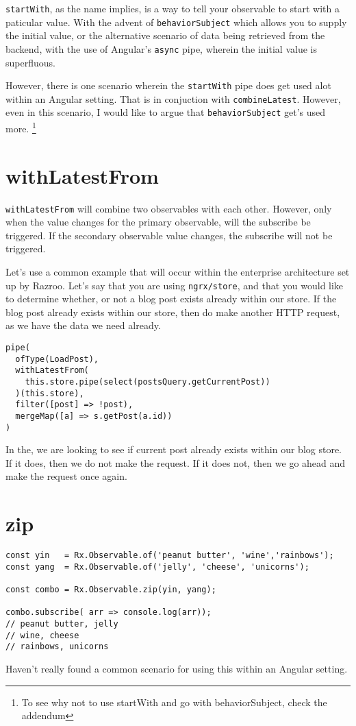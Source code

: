 \lstinline{startWith}, as the name implies, is a way to tell your observable 
to start with a paticular value. With the advent of \lstinline{behaviorSubject}
which allows you to supply the initial value, or the alternative scenario 
of data being retrieved from the backend, with the use of Angular's 
\lstinline{async} pipe, wherein the initial value is superfluous. 

However, there is one scenario wherein the \lstinline{startWith} pipe does get
used alot within an Angular setting. That is in conjuction with 
\lstinline{combineLatest}. However, even in this scenario, I would like to argue
that \lstinline{behaviorSubject} get's used more. \footnote{To see why not to 
use startWith and go with behaviorSubject, check the addendum}

\section{withLatestFrom}
\lstinline{withLatestFrom} will combine two observables with each other. However,
only when the value changes for the primary observable, will the subscribe be 
triggered. If the secondary observable value changes, the subscribe will not be 
triggered. 

Let's use a common example that will occur within the enterprise architecture 
set up by Razroo. Let's say that you are using \lstinline{ngrx/store}, and
that you would like to determine whether, or not a blog post exists already
within our store. If the blog post already exists within our store, then do
make another HTTP request, as we have the data we need already. 

\begin{lstlisting}[caption=data-access-post.ts]
pipe(
  ofType(LoadPost),
  withLatestFrom(
    this.store.pipe(select(postsQuery.getCurrentPost))
  )(this.store),
  filter([post] => !post),
  mergeMap([a] => s.getPost(a.id))
)
\end{lstlisting}

In the, we are looking to see if current post already exists within our blog 
store. If it does, then we do not make the request. If it does not, then 
we go ahead and make the request once again. 

\section{zip}

\begin{lstlisting}[caption=yin-yang.component.ts]
const yin   = Rx.Observable.of('peanut butter', 'wine','rainbows');
const yang  = Rx.Observable.of('jelly', 'cheese', 'unicorns');

const combo = Rx.Observable.zip(yin, yang);

combo.subscribe( arr => console.log(arr));
// peanut butter, jelly
// wine, cheese
// rainbows, unicorns  
\end{lstlisting}

Haven't really found a common scenario for using this within an Angular 
setting.